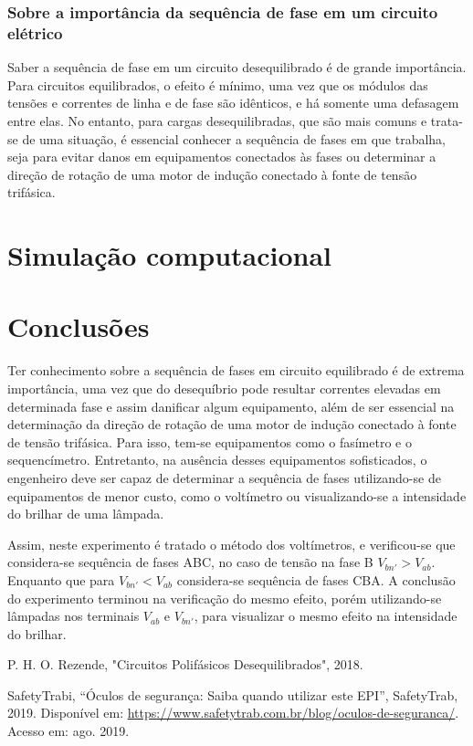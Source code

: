 \documentclass[a4paper,12pt,oneside,openany,table,xcdraw]{article}
\begin{document}
\subsubsection{Sobre a importância da sequência de fase em um circuito elétrico}
Saber a sequência de fase em um circuito desequilibrado é de grande importância. Para circuitos equilibrados, o efeito é mínimo, uma vez que os módulos das tensões e correntes de linha e de fase são idênticos, e há somente uma defasagem entre elas. No entanto, para cargas desequilibradas, que são mais comuns e trata-se de uma situação, é essencial conhecer a sequência de fases em que trabalha, seja para evitar danos em equipamentos conectados às fases ou determinar a direção de
rotação de uma motor de indução
conectado à fonte de tensão trifásica.

\vspace{1cm}
\section{Simulação computacional} %

\vspace{2cm}
\section{Conclusões} %
Ter conhecimento sobre a sequência de fases em circuito equilibrado é de extrema importância, uma vez que do desequíbrio pode resultar correntes elevadas em determinada fase e assim danificar algum equipamento, além de ser essencial na determinação da direção de rotação de uma motor de indução
conectado à fonte de tensão trifásica. Para isso, tem-se equipamentos como o fasímetro e o sequencímetro. Entretanto, na ausência desses equipamentos sofisticados, o engenheiro deve ser capaz de determinar a sequência de fases utilizando-se de equipamentos de menor custo, como o voltímetro ou visualizando-se a intensidade do brilhar de uma lâmpada.

Assim, neste experimento é tratado o método dos voltímetros, e verificou-se que considera-se sequência de fases ABC, no caso de tensão na fase B $V_{bn'}>V_{ab}$. Enquanto que para $V_{bn'}<V_{ab}$ considera-se sequência de fases CBA. A conclusão do experimento terminou na verificação do mesmo efeito, porém utilizando-se lâmpadas nos terminais $V_{ab}$ e $V_{bn'}$, para visualizar o mesmo efeito na intensidade do brilhar.

\newpage
\begin{thebibliography}{9} 
    P. H. O. Rezende,
    "Circuitos Polifásicos Desequilibrados", 2018.

    SafetyTrabi,
    “Óculos de segurança: Saiba quando utilizar este EPI”, SafetyTrab, 2019.
 Disponível em:
 \url{https://www.safetytrab.com.br/blog/oculos-de-seguranca/}. Acesso em: ago. 2019.

\end{thebibliography}
\end{document}
